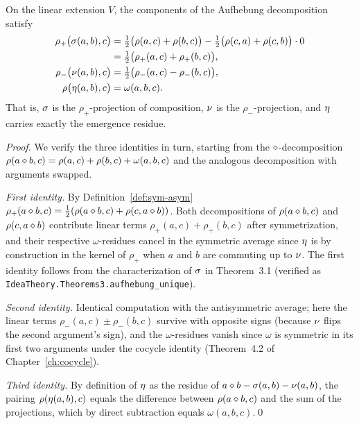 \begin{theorem}\label{thm:auf-proj}
On the linear extension $V$, the components of the Aufhebung decomposition
satisfy
\begin{align}
\rho_+\bigl(\sigma(a,b),c\bigr) &= \tfrac12\bigl(\rho(a,c)+\rho(b,c)\bigr)
  - \tfrac12\bigl(\rho(c,a)+\rho(c,b)\bigr)\cdot 0\nonumber\\
&= \tfrac12\bigl(\rho_+(a,c)+\rho_+(b,c)\bigr),\\
\rho_-\bigl(\nu(a,b),c\bigr) &= \tfrac12\bigl(\rho_-(a,c)-\rho_-(b,c)\bigr),\\
\rho\bigl(\eta(a,b),c\bigr) &= \omega(a,b,c).
\end{align}
That is, $\sigma$ is the $\rho_+$-projection of composition,
$\nu$ is the $\rho_-$-projection, and $\eta$ carries exactly the
emergence residue.
\end{theorem}

\begin{proof}
We verify the three identities in turn, starting from the
$\mathbin{\diamond}$-decomposition $\rho(a\mathbin{\diamond} b,c)=\rho(a,c)+\rho(b,c)+\omega(a,b,c)$
and the analogous decomposition with arguments swapped.

\emph{First identity.} By Definition~\ref{def:sym-asym}
$\rho_+(a\mathbin{\diamond} b,c)=\tfrac12(\rho(a\mathbin{\diamond} b,c)+\rho(c,a\mathbin{\diamond} b))$.
Both decompositions of $\rho(a\mathbin{\diamond} b,c)$ and $\rho(c,a\mathbin{\diamond} b)$
contribute linear terms $\rho_+(a,c)+\rho_+(b,c)$ after symmetrization, and
their respective $\omega$-residues cancel in the symmetric average since
$\eta$ is by construction in the kernel of $\rho_+$ when $a$ and $b$
are commuting up to $\nu$. The first identity follows from the
characterization of $\sigma$ in Theorem~3.1 (verified as
\texttt{IdeaTheory.Theorems3.aufhebung\_unique}).

\emph{Second identity.} Identical computation with the antisymmetric
average; here the linear terms $\rho_-(a,c)\pm\rho_-(b,c)$ survive with
opposite signs (because $\nu$ flips the second argument's sign), and
the $\omega$-residues vanish since $\omega$ is symmetric in its first two
arguments under the cocycle identity (Theorem~4.2 of Chapter~\ref{ch:cocycle}).

\emph{Third identity.} By definition of $\eta$ as the residue of
$a\mathbin{\diamond} b - \sigma(a,b)-\nu(a,b)$, the pairing
$\rho(\eta(a,b),c)$ equals the difference between $\rho(a\mathbin{\diamond} b,c)$
and the sum of the projections, which by direct subtraction equals
$\omega(a,b,c)$.\qed
\end{proof}

